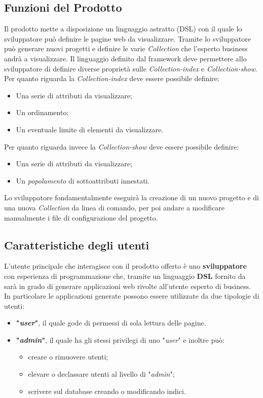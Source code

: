 	\subsection{Funzioni del Prodotto}
	Il prodotto \ProjectName{} mette a disposizione un linguaggio astratto (DSL) con il quale lo sviluppatore può definire le pagine web da visualizzare. Tramite \ProjectName{} lo sviluppatore può generare nuovi progetti e definire le varie \textit{Collection} che l'esperto business andrà a visualizzare. Il linguaggio definito dal framework deve permettere allo sviluppatore di definire diverse proprietà sulle \textit{Collection-index} e \textit{Collection-show}. Per quanto riguarda la \textit{Collection-index} deve essere possibile definire:
	\begin{itemize}
		\item Una serie di attributi da visualizzare;
		\item Un ordinamento;
		\item Un eventuale limite di elementi da visualizzare.
	\end{itemize}
	Per quanto riguarda invece la \textit{Collection-show} deve essere possibile definire:
	\begin{itemize}	
		\item Una serie di attributi da visualizzare;
		\item Un \textit{popolamento} di sottoattributi innestati.	
	\end{itemize}
	
Lo sviluppatore fondamentalmente eseguirà la creazione di un nuovo progetto e di una nuova \textit{Collection} da linea di comando, per poi andare a modificare manualmente i file di configurazione del progetto.
		
	\subsection{Caratteristiche degli utenti}
	L'utente principale che interagisce con il prodotto offerto è uno \textbf{sviluppatore} con esperienza di programmazione che, tramite un linguaggio \textbf{DSL} fornito da \ProjectName{} sarà in grado di generare applicazioni web rivolte all'utente esperto di business. In particolare le applicazioni generate possono essere utilizzate da due tipologie di utenti:
	\begin{itemize}
		\item \textbf{"\textit{user}"}, il quale gode di permessi di sola lettura delle pagine. 
		\item \textbf{"\textit{admin}"}, il quale ha gli stessi privilegi di uno "\textit{user}" e inoltre può:
		\begin{itemize}
			\item creare o rimuovere utenti;
			\item elevare o declassare utenti al livello di "\textit{admin}";
			\item scrivere sul database creando o modificando indici.
		\end{itemize}		 	
	\end{itemize}
	

